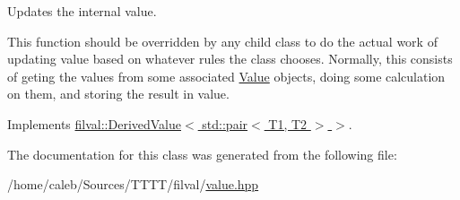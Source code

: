 Updates the internal value. 

This function should be overridden by any child class to do the actual work of updating value based on whatever rules the class chooses. Normally, this consists of geting the values from some associated \hyperlink{classfilval_1_1Value}{Value} objects, doing some calculation on them, and storing the result in value. 

Implements \hyperlink{classfilval_1_1DerivedValue_a74e04450a550454510329a9e6b941304}{filval\+::\+Derived\+Value$<$ std\+::pair$<$ T1, T2 $>$ $>$}.



The documentation for this class was generated from the following file\+:\begin{DoxyCompactItemize}
\item 
/home/caleb/\+Sources/\+T\+T\+T\+T/filval/\hyperlink{value_8hpp}{value.\+hpp}\end{DoxyCompactItemize}
